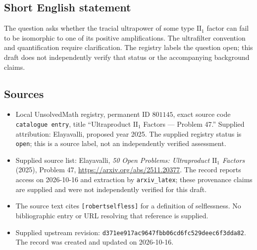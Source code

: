 \documentclass[11pt]{article}
\begin{document}
\subsection{Short English statement}
The question asks whether the tracial ultrapower of some type \(\mathrm{II}_1\) factor can fail to be isomorphic to one of its positive amplifications. The ultrafilter convention and quantification require clarification. The registry labels the question open; this draft does not independently verify that status or the accompanying background claims.
\subsection{Sources}
\begin{itemize}
\item Local UnsolvedMath registry, permanent ID \(801145\), exact source code \texttt{catalogue entry}, title ``Ultraproduct \(\mathrm{II}_1\) Factors --- Problem 47.'' Supplied attribution: Elayavalli, proposed year 2025. The supplied registry status is \texttt{open}; this is a source label, not an independently verified assessment.
\item Supplied source list: Elayavalli, \emph{50 Open Problems: Ultraproduct \(\mathrm{II}_1\) Factors} (2025), Problem 47, \url{https://arxiv.org/abs/2511.20377}. The record reports access on 2026-10-16 and extraction by \texttt{arxiv\_latex}; these provenance claims are supplied and were not independently verified for this draft.
\item The source text cites \texttt{[robertselfless]} for a definition of selflessness. No bibliographic entry or URL resolving that reference is supplied.
\item Supplied upstream revision: \texttt{d371ee917ac9647fbb06cd6fc529deec6f3dda82}. The record was created and updated on 2026-10-16.
\end{itemize}
\end{document}
